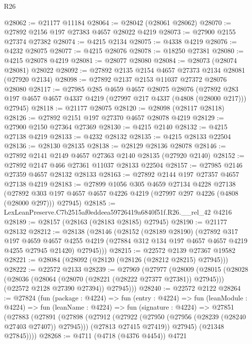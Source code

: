 \begin{lexlean}{R26}
\begin{coremodule}
@28062 := @21177 @11184
@28064 := @28042 (@28061 @28062)
@28070 := @27892 @2156 @197 @27383 @4657 @28022 @4219
@28073 := @27900 @2155 @27374 @27382
@28074 := @4215 @2134
@28075 := @4338 @4219
@28076 := @4232 @28075
@28077 := @4215 @28076
@28078 := @18250 @27381
@28080 := @4215 @28078 @4219
@28081 := @28077 @28080
@28084 := @28073 (@28074 @28081) @28022
@28092 := @27892 @2135 @2154 @4657 @27373 @2134 @28081 (@27920 @2134)
@28098 := @27892 @2137 @2153 @11037 @27372 @28076 @28080
@28117 := @27985
    @285
    @4659
    @4657
    @28075
    @28076
    (@27892 @283 @197 @4657 @4657 @4337 @4219 (@27997 @217 @4337 (@4808 (@28000 @217))) @27945)
@28118 := @21177 @28075
@28120 := @28098 (@28117 @28118)
@28126 := @27892 @2151 @197 @27370 @4657 @28078 @4219
@28129 := @27900 @2150 @27364 @27369
@28130 := @4215 @2140
@28132 := @4215 @27138 @4219
@28133 := @4232 @28132
@28135 := @4215 @28133 @22504
@28136 := @28130 @28135
@28138 := @28129 @28136 @28078
@28146 := @27892 @2141 @2149 @4657 @27363 @2140 @28135 (@27920 @2140)
@28152 := @27892 @2147 @466 @27361 @11037 @28133 @22504
@28157 := @27985 @2146 @27359 @4657 @28132 @28133
@28163 := @27892 @2144 @197 @27357 @4657 @27138 @4219
@28183 := @27899
    @1056
    @305
    @4659
    @27134
    @4228
    @27138
    (@27892 @303 @197 @4657 @4657 @4226 @4219 (@27997 @297 @4226 (@4808 (@28000 @297))) @27945)
@28185 := LexLeanPreserve.C7b2515af0eddeea59726419a6840f51f.R26.__rel_42 @4216
@28189 := @28157 (@28163 (@28183 @28185) @27945)
@28190 := @21177 @28132
@28212 := @28138
    (@28146
      (@28152
        (@28189 @28190)
        (@27892
          @317
          @197
          @4659
          @4657
          @4255
          @4219
          (@27884 @312 @134 @197 @4657 @4657 @4219 @4255 @27945 @21420)
          @27945)))
@28215 := @22572 @2139 @27367 @19582
@28221 := @28084 (@28092 (@28120 (@28126 (@28212 @28215) @27945)))
@28222 := @22572 @2133
@28239 := @27969
    (@27977
      (@28009
        (@28015
          (@28028
            (@28036 (@28064 (@28070 (@28221 (@28222 @27377 @27381)) @27945)))
            (@22572 @2128 @27390 @27394))
          @27945)))
@28240 := @22572 @2122
@28264 := @27824
    (fun (package : @4224) =>
    fun (entry : @4224) =>
    fun (leanModule : @4224) =>
    fun (leanName : @4224) =>
    fun (signature : @4224) =>
    @27851
      (@27883
        (@27891
          (@27898
            (@27912
              (@27922 (@27950 (@27956 (@28239 (@28240 @27403 @27407)) @27945)))
              (@27813 @27415 @27419))
            @27945)
          (@21348 @27845))))
@28268 := @4711 (@4718 (@4376 @4454)) @4721

\end{coremodule}
\end{lexlean}
